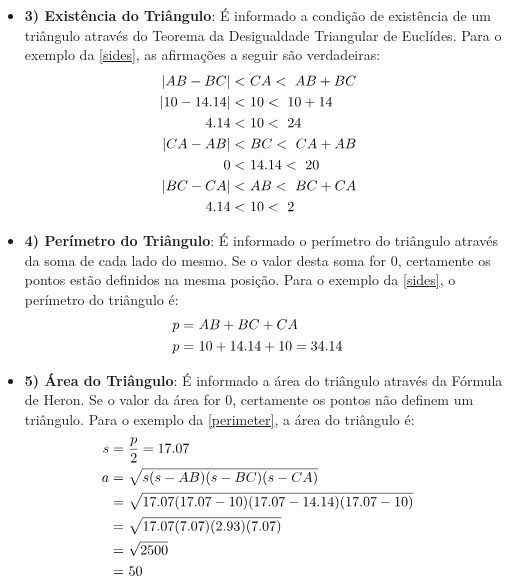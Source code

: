 \begin{itemize}
{\begin{itemize}
{\begin{align}
						CA = \ t_{c,a} = \ &\sqrt{\left(0 - 10 \right)^{2} + \left(0 - 0 \right)^{2}} = 10& \label{sides}
					\end{align}}
					\item{\textbf{3) Existência do Triângulo}: É informado a condição de existência de um triângulo através do Teorema da Desigualdade Triangular de Euclídes. Para o exemplo da \cref{sides}, as afirmações a seguir são verdadeiras:
					\begin{align}
						|AB - BC| < \ &CA < \ AB + BC& \notag \\
						|10 - 14.14| < \ &10 < \ 10 + 14& \notag \\
						4.14 < \ &10 < \ 24& \notag \\
						|CA - AB| < \ &BC < \ CA + AB& \notag \\
						0 < \ &14.14 < \ 20& \notag \\
						|BC - CA| < \ &AB < \ BC + CA& \notag \\
						4.14 < \ &10 < \ 2& \label{existence}
					\end{align}}
					\item{\textbf{4) Perímetro do Triângulo}: É informado o perímetro do triângulo através da soma de cada lado do mesmo. Se o valor desta soma for 0, certamente os pontos estão definidos na mesma posição. Para o exemplo da \cref{sides}, o perímetro do triângulo é:
					\begin{align}
						p = \ &AB + BC + CA& \notag \\
						p = \ &10 + 14.14 + 10 = 34.14& \label{perimeter}
					\end{align}}
					\item{\textbf{5) Área do Triângulo}: É informado a área do triângulo através da Fórmula de Heron. Se o valor da área for 0, certamente os pontos não definem um triângulo. Para o exemplo da \cref{perimeter}, a área do triângulo é:
					\begin{align}
						s = \ &\frac{p}{2} = 17.07& \notag \\
						a = \ &\sqrt{s(s-AB)(s-BC)(s-CA)}& \notag \\
						= \ &\sqrt{17.07 (17.07 - 10)(17.07 - 14.14)(17.07 - 10)}& \notag \\
						= \ &\sqrt{17.07 (7.07)(2.93)(7.07)}& \notag \\
						= \ &\sqrt{2500}& \notag \\
						= \ &50& \label{perimeter}
					\end{align}}
				\end{itemize}}
			\end{itemize}

